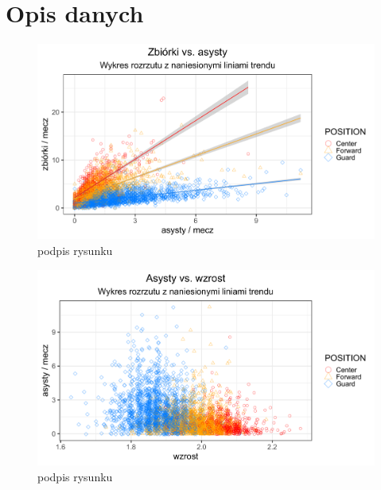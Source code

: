\documentclass[12pt,a4paper]{article}\usepackage[]{graphicx}\usepackage[]{color}
\makeatletter
\def\maxwidth{ %
  \ifdim\Gin@nat@width>\linewidth
    \linewidth
  \else
    \Gin@nat@width
  \fi
}
\newenvironment{knitrout}{}{} %
\makeatother
\begin{document}
\section{Opis danych}
\begin{knitrout}
\color{fgcolor}\begin{figure}

{\centering \includegraphics[width=\maxwidth]{figure/unnamed-chunk-1-1} 

}

\caption[podpis rysunku]{podpis rysunku}\label{fig:unnamed-chunk-1}
\end{figure}

\end{knitrout}

\begin{knitrout}
\color{fgcolor}\begin{figure}

{\centering \includegraphics[width=\maxwidth]{figure/unnamed-chunk-2-1} 

}

\caption[podpis rysunku]{podpis rysunku}\label{fig:unnamed-chunk-2}
\end{figure}

\end{knitrout}
\end{document}
